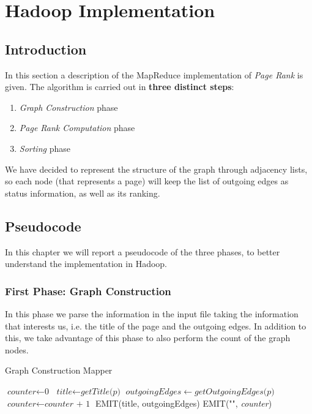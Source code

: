 \section{Hadoop Implementation}

\subsection{Introduction}
In this section a description of the MapReduce implementation of \textit{Page Rank} is given.
The algorithm is carried out in \textbf{three distinct steps}:
\begin{enumerate}
	\item \textit{Graph Construction} phase
	\item \textit{Page Rank Computation} phase
	\item \textit{Sorting} phase
\end{enumerate}

\noindent We have decided to represent the structure of the graph through adjacency lists, so each node (that represents a page) will keep the list of outgoing edges as status information, as well as its ranking.

\subsection{Pseudocode}
In this chapter we will report a pseudocode of the three phases, to better understand the implementation in Hadoop.
\subsubsection{First Phase: Graph Construction}
In this phase we parse the information in the input file taking the information that interests us, i.e. the title of the page and the outgoing edges. In addition to this, we take advantage of this phase to also perform the count of the graph nodes.

\begin{algorithm}[H]
	\caption{Graph Construction Mapper}\label{GraphConstructionMapper}
		\begin{algorithmic}[1]
				\State $\textit{counter} \gets \textit{0}$
			\EndProcedure
					\State $\textit{title} \gets \textit{getTitle(p)}$
					\State $ outgoingEdges \gets \textit{getOutgoingEdges(p)}$
					\State $\textit{counter} \gets \textit{counter + 1}$
					\State EMIT(title, outgoingEdges)
			\EndProcedure
				\State EMIT("", \textit{counter})	
			\EndProcedure
			
	\end{algorithmic}
\end{algorithm}

